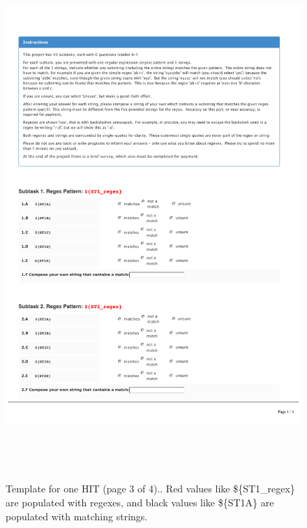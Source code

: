 \begin{figure}[!htbp]
       \includegraphics[page=3, height=20cm, keepaspectratio]{nontex/MTtemplate}
 \caption{Template for one HIT (page 3 of 4)..  Red values like  \$\{ST1\_regex\} are populated with regexes, and black values like \$\{ST1A\} are populated with matching strings.}
 \label{fig:MTtemplate3}
\end{figure}

